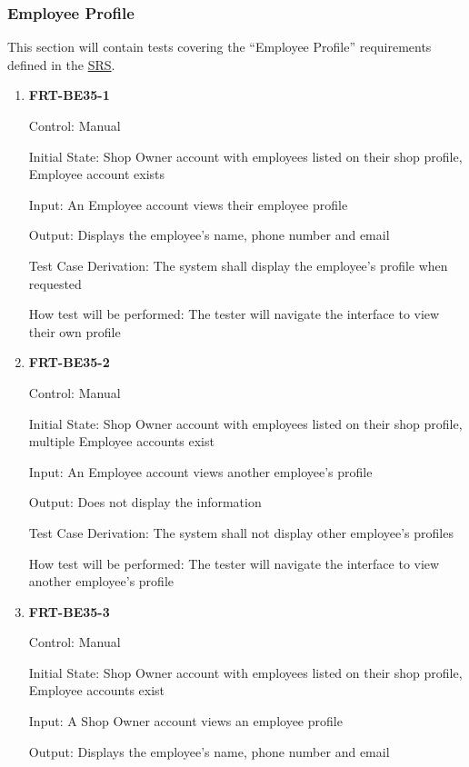 \documentclass[12pt, titlepage]{article}
\begin{document}
\subsubsection{Employee Profile}

This section will contain tests covering the ``Employee Profile'' requirements defined in the
\href{https://github.com/arkinmodi/project-sayyara/blob/main/docs/SRS/SRS.pdf}{SRS}.

\begin{enumerate}
	\item \textbf{FRT-BE35-1}

	      Control: Manual

	      Initial State: Shop Owner account with employees listed on their shop profile, Employee account
	      exists

	      Input: An Employee account views their employee profile

	      Output: Displays the employee's name, phone number and email

	      Test Case Derivation: The system shall display the employee's profile when requested

	      How test will be performed: The tester will navigate the interface to view their own profile

	\item \textbf{FRT-BE35-2}

	      Control: Manual

	      Initial State: Shop Owner account with employees listed on their shop profile, multiple Employee
	      accounts exist

	      Input: An Employee account views another employee's profile

	      Output: Does not display the information

	      Test Case Derivation: The system shall not display other employee's profiles

	      How test will be performed: The tester will navigate the interface to view another employee's
	      profile

	\item \textbf{FRT-BE35-3}

	      Control: Manual

	      Initial State: Shop Owner account with employees listed on their shop profile, Employee accounts
	      exist

	      Input: A Shop Owner account views an employee profile

	      Output: Displays the employee's name, phone number and email


\end{enumerate}
\end{document}
